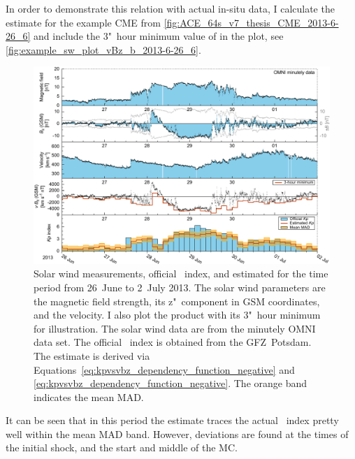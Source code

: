 In order to demonstrate this relation with actual in-situ data, I calculate the \Kp{} estimate for the example CME from \autoref{fig:ACE_64s_v7_thesis_CME_2013-6-26_6} and include the 3"~hour minimum value of \vBz{} in the plot, see \autoref{fig:example_sw_plot_vBz_b_2013-6-26_6}.
\begin{figure}[htb]
	\centering
	\includegraphics[width=\textwidth]{figures_of_mine/chapter2/example_sw_plot_vBz_b_2013-6-26_6.pdf}
	\caption[]
	{Solar wind measurements, official \Kp{}~index, and estimated \Kp{} for the time period from 26~June to 2~July 2013. The solar wind parameters are the magnetic field strength, its z"~component in GSM coordinates, and the velocity. I also plot the product \vBz{} with its 3"~hour minimum for illustration. The solar wind data are from the minutely OMNI data set. The official \Kp{}~index is obtained from the GFZ~Potsdam. The \Kp{} estimate is derived via Equations~\ref{eq:kpvsvbz_dependency_function_negative} and \ref{eq:kpvsvbz_dependency_function_negative}. The orange band indicates the mean MAD.}
	\label{fig:example_sw_plot_vBz_b_2013-6-26_6}
\end{figure}
It can be seen that in this period the \Kp{} estimate traces the actual \Kp{}~index pretty well within the mean MAD band. However, deviations are found at the times of the initial shock, and the start and middle of the MC.

